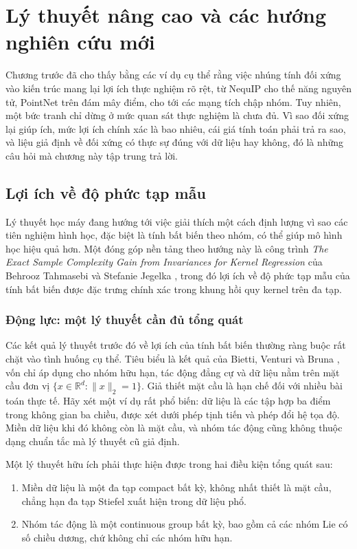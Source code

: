 \section{Lý thuyết nâng cao và các hướng nghiên cứu mới}
\label{sec:ly-thuyet-nang-cao}

Chương trước đã cho thấy bằng các ví dụ cụ thể rằng việc nhúng tính đối xứng vào kiến trúc mang lại lợi ích thực nghiệm rõ rệt, từ NequIP cho thế năng nguyên tử, PointNet trên đám mây điểm, cho tới các mạng tích chập nhóm. Tuy nhiên, một bức tranh chỉ dừng ở mức quan sát thực nghiệm là chưa đủ. Vì sao đối xứng lại giúp ích, mức lợi ích chính xác là bao nhiêu, cái giá tính toán phải trả ra sao, và liệu giả định về đối xứng có thực sự đúng với dữ liệu hay không, đó là những câu hỏi mà chương này tập trung trả lời.

\subsection{Lợi ích về độ phức tạp mẫu}
\label{subsec:sample-complexity}
 
Lý thuyết học máy đang hướng tới việc giải thích một cách định lượng vì sao các tiên nghiệm hình học, đặc biệt là tính bất biến theo nhóm, có thể giúp mô hình học hiệu quả hơn. Một đóng góp nền tảng theo hướng này là công trình \textit{The Exact Sample Complexity Gain from Invariances for Kernel Regression} của Behrooz Tahmasebi và Stefanie Jegelka \cite{tahmasebi2023exact}, trong đó lợi ích về độ phức tạp mẫu của tính bất biến được đặc trưng chính xác trong khung hồi quy kernel trên đa tạp.
 
\subsubsection{Động lực: một lý thuyết cần đủ tổng quát}
 
Các kết quả lý thuyết trước đó về lợi ích của tính bất biến thường ràng buộc rất chặt vào tình huống cụ thể. Tiêu biểu là kết quả của Bietti, Venturi và Bruna \cite{bietti2021sample}, vốn chỉ áp dụng cho nhóm hữu hạn, tác động đẳng cự và dữ liệu nằm trên mặt cầu đơn vị $\{x \in \mathbb{R}^d : \|x\|_2 = 1\}$. Giả thiết mặt cầu là hạn chế đối với nhiều bài toán thực tế. Hãy xét một ví dụ rất phổ biến: dữ liệu là các tập hợp ba điểm trong không gian ba chiều, được xét dưới phép tịnh tiến và phép đổi hệ tọa độ. Miền dữ liệu khi đó không còn là mặt cầu, và nhóm tác động cũng không thuộc dạng chuẩn tắc mà lý thuyết cũ giả định.
 
Một lý thuyết hữu ích phải thực hiện được trong hai điều kiện tổng quát sau:
\begin{enumerate}
    \item Miền dữ liệu là một đa tạp compact bất kỳ, không nhất thiết là mặt cầu, chẳng hạn đa tạp Stiefel xuất hiện trong dữ liệu phổ.
    \item Nhóm tác động là một continuous group bất kỳ, bao gồm cả các nhóm Lie có số chiều dương, chứ không chỉ các nhóm hữu hạn.
\end{enumerate}
 
